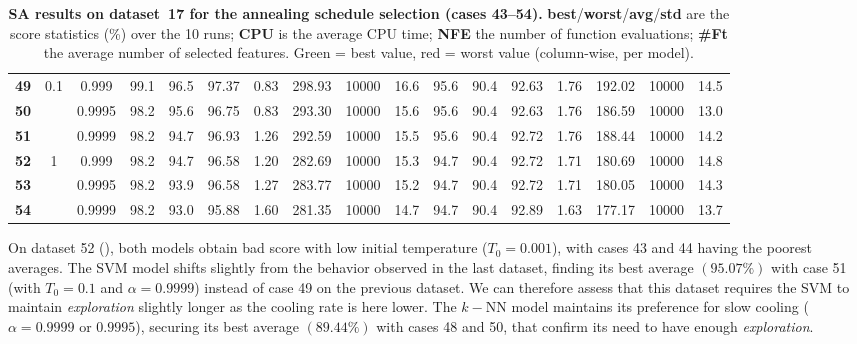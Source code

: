 \documentclass[12pt, openany]{article}
\begin{document}
\begin{table}[H]
{\begin{tabular}{|c|c|c|c c c c c c c|c c c c c c c|}
        \hdashline
        
        \textbf{49} & \multirow{3}{*}{0.1} & 0.999 & \cellcolor{best}99.1 & 96.5 & \cellcolor{best}97.37 & 0.83 & 298.93 & 10000 & 16.6 & \cellcolor{best}95.6 & 90.4 & 92.63 & 1.76 & 192.02 & 10000 & 14.5 \\
        
        \textbf{50} &  & 0.9995 & 98.2 & 95.6 & 96.75 & 0.83 & 293.30 & 10000 & 15.6 & \cellcolor{best}95.6 & 90.4 & 92.63 & 1.76 & 186.59 & 10000 & 13.0 \\
        
        \textbf{51} &  & 0.9999 & 98.2 & 94.7 & 96.93 & 1.26 & 292.59 & 10000 & 15.5 & \cellcolor{best}95.6 & 90.4 & 92.72 & 1.76 & 188.44 & 10000 & 14.2 \\

        \hdashline
        
        \textbf{52} & \multirow{3}{*}{1} & 0.999 & 98.2 & 94.7 & 96.58 & 1.20 & 282.69 & 10000 & 15.3 & \cellcolor{worst}94.7 & 90.4 & 92.72 & 1.71 & 180.69 & 10000 & 14.8 \\
        
        \textbf{53} & & 0.9995 & 98.2 & 93.9 & 96.58 & 1.27 & 283.77 & 10000 & 15.2 & \cellcolor{worst}94.7 & 90.4 & 92.72 & 1.71 & 180.05 & 10000 & 14.3 \\
        
        \textbf{54} & & 0.9999 & 98.2 & 93.0 & \cellcolor{worst}95.88 & 1.60 & 281.35 & 10000 & 14.7 & \cellcolor{worst}94.7 & 90.4 & \cellcolor{best}92.89 & 1.63 & 177.17 & 10000 & 13.7 \\
        \hline
    \end{tabular}
    }
    \caption{\textbf{SA results on dataset~17 for the annealing schedule selection (cases 43--54).} \textbf{best}/\textbf{worst}/\textbf{avg}/\textbf{std} are the score statistics (\%) over the 10 runs; \textbf{CPU} is the average CPU time; \textbf{NFE} the number of function evaluations; \textbf{\#Ft} the average number of selected features. Green = best value, red = worst value (column-wise, per model).}
    \label{tab:results_SA_schedule_d17}
\end{table}

On dataset 52 (), both models obtain bad score with low initial temperature ($T_0=0.001$), with cases 43 and 44 having the poorest averages. The SVM model shifts slightly from the behavior observed in the last dataset, finding its best average $(95.07\%)$ with case 51 (with $T_0=0.1$ and $\alpha=0.9999$) instead of case 49 on the previous dataset. We can therefore assess that this dataset requires the SVM to maintain \emph{exploration} slightly longer as the cooling rate is here lower. The $k-$NN model maintains its preference for slow cooling ($\alpha=0.9999$ or $0.9995$), securing its best average $(89.44\%)$ with cases 48 and 50, that confirm its need to have enough \emph{exploration}.
\end{document}
